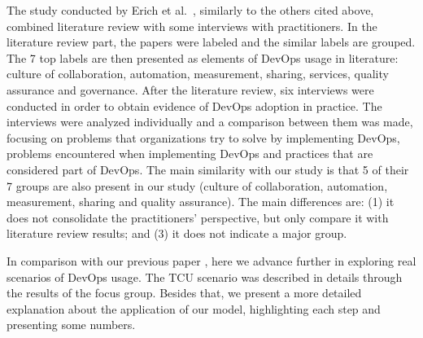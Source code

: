 The study conducted by Erich et al.~\cite{qualitative_devops_journalsw_17},
similarly to the others cited above, combined literature review with some
interviews with practitioners. In the literature review part, the papers were
labeled and the similar labels are grouped. The 7 top labels are then presented
as elements of DevOps usage in literature: culture of collaboration, automation,
measurement, sharing, services, quality assurance and governance. After the literature
review, six interviews were conducted in order to obtain evidence of DevOps
adoption in practice. The interviews were analyzed individually and a comparison
between them was made, focusing on problems that organizations try to solve by
implementing DevOps, problems encountered when implementing DevOps and practices
that are considered part of DevOps. The main similarity with our study
is that 5 of their 7 groups are also present in our study (culture of collaboration,
automation, measurement, sharing and quality assurance). The main
differences are: (1) it does not consolidate the practitioners' perspective, but
only compare it with literature review results; and (3) it does not indicate a major group.

In comparison with our previous paper \cite{Luz:2018:ESEM}, here we advance
further in exploring real scenarios of DevOps usage. The TCU scenario was
described in details through the results of the focus group. Besides that, we
present a more detailed explanation about the application of our model,
highlighting each step and presenting some numbers.
